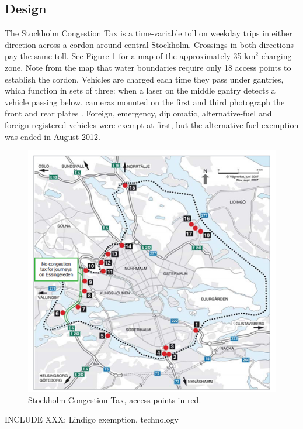 \subsection{Design}

The Stockholm Congestion Tax is a time-variable toll on weekday trips in either direction across a cordon around central Stockholm. Crossings in both directions pay the same toll. See Figure \ref{fig:stockholm-map} for a map of the approximately 35 km$^{2}$ charging zone. Note from the map that water boundaries require only 18 access points to establish the cordon. Vehicles are charged each time they pass under gantries, which function in sets of three: when a laser on the middle gantry detects a vehicle passing below, cameras mounted on the first and third photograph the front and rear plates \citep{FAQ2015}. Foreign, emergency, diplomatic, alternative-fuel and foreign-registered vehicles were exempt at first, but the alternative-fuel exemption was ended in August 2012.

\begin{figure}
\includegraphics[width=5in]{../img/stockholm-map.png}
\caption{Stockholm Congestion Tax, access points in red. \citep{transportstyrelsen2015}}
\label{fig:stockholm-map}
\end{figure}

INCLUDE XXX: Lindigo exemption, technology


